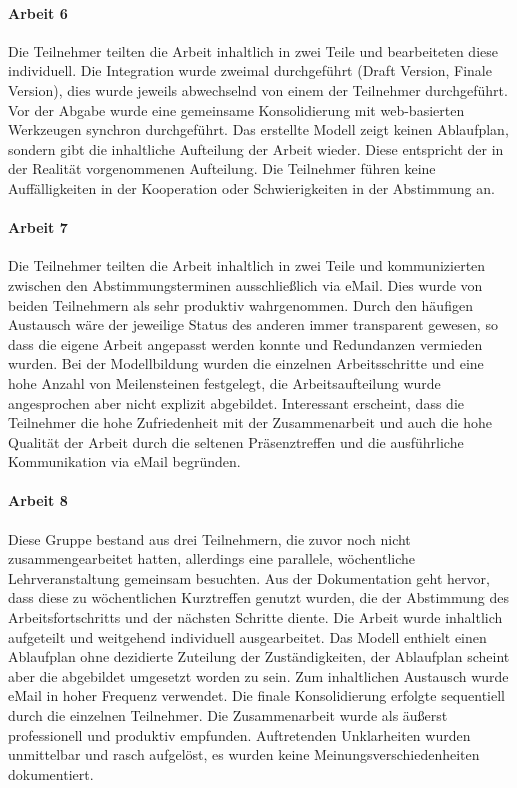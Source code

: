 \paragraph{Arbeit 6} %
\label{par:arbeit_6}

Die Teilnehmer teilten die Arbeit inhaltlich in zwei Teile und bearbeiteten diese individuell. Die Integration wurde zweimal durchgeführt (Draft Version, Finale Version), dies wurde jeweils abwechselnd von einem der Teilnehmer durchgeführt. Vor der Abgabe wurde eine gemeinsame Konsolidierung mit web-basierten Werkzeugen synchron durchgeführt. Das erstellte Modell zeigt keinen Ablaufplan, sondern gibt die inhaltliche Aufteilung der Arbeit wieder. Diese entspricht der in der Realität vorgenommenen Aufteilung. Die Teilnehmer führen keine Auffälligkeiten in der Kooperation oder Schwierigkeiten in der Abstimmung an.


\paragraph{Arbeit 7} %
\label{par:arbeit_7}

Die Teilnehmer teilten die Arbeit inhaltlich in zwei Teile und kommunizierten zwischen den Abstimmungsterminen ausschließlich via eMail. Dies wurde von beiden Teilnehmern als sehr produktiv wahrgenommen. Durch den häufigen Austausch wäre der jeweilige Status des anderen immer transparent gewesen, so dass die eigene Arbeit angepasst werden konnte und Redundanzen vermieden wurden. Bei der Modellbildung wurden die einzelnen Arbeitsschritte und eine hohe Anzahl von Meilensteinen festgelegt, die Arbeitsaufteilung wurde angesprochen aber nicht explizit abgebildet. Interessant erscheint, dass die Teilnehmer die hohe Zufriedenheit mit der Zusammenarbeit und auch die hohe Qualität der Arbeit durch die seltenen Präsenztreffen und die ausführliche Kommunikation via eMail begründen.


\paragraph{Arbeit 8} %
\label{par:arbeit_8}

Diese Gruppe bestand aus drei Teilnehmern, die zuvor noch nicht zusammengearbeitet hatten, allerdings eine parallele, wöchentliche Lehrveranstaltung gemeinsam besuchten. Aus der Dokumentation geht hervor, dass diese zu wöchentlichen Kurztreffen genutzt wurden, die der Abstimmung des Arbeitsfortschritts und der nächsten Schritte diente. Die Arbeit wurde inhaltlich aufgeteilt und weitgehend individuell ausgearbeitet. Das Modell enthielt einen Ablaufplan ohne dezidierte Zuteilung der Zuständigkeiten, der Ablaufplan scheint aber die abgebildet umgesetzt worden zu sein. Zum inhaltlichen Austausch wurde eMail in hoher Frequenz verwendet. Die finale Konsolidierung erfolgte sequentiell durch die einzelnen Teilnehmer. Die Zusammenarbeit wurde als äußerst professionell und produktiv empfunden. Auftretenden Unklarheiten wurden unmittelbar und rasch aufgelöst, es wurden keine Meinungsverschiedenheiten dokumentiert.

